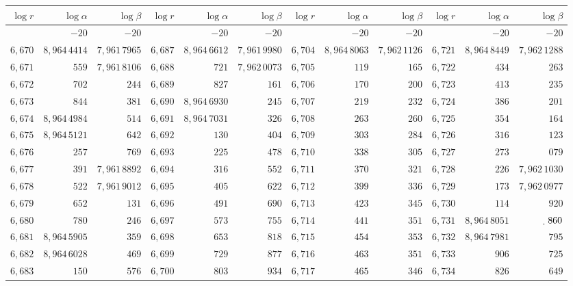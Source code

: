 \begin{center}
\begingroup\fontsize{6.7}{8.4}\selectfont\setlength{\tabcolsep}{1.6pt}\renewcommand{\arraystretch}{1.12}
\begin{tabular}{|r|r|r||r|r|r||r|r|r||r|r|r|}
\hline
$\log r$&$\log\alpha$&$\log\beta$&$\log r$&$\log\alpha$&$\log\beta$&$\log r$&$\log\alpha$&$\log\beta$&$\log r$&$\log\alpha$&$\log\beta$\\\hline\hline
&$-20$&$-20$&&$-20$&$-20$&&$-20$&$-20$&&$-20$&$-20$\\[-3pt]
$6{,}670$&$8{,}964\,4414$&$7{,}961\,7965$&$6{,}687$&$8{,}964\,6612$&$7{,}961\,9980$&$6{,}704$&$8{,}964\,8063$&$7{,}962\,1126$&$6{,}721$&$8{,}964\,8449$&$7{,}962\,1288$\\
$6{,}671$&$559$&$7{,}961\,8106$&$6{,}688$&$721$&$7{,}962\,0073$&$6{,}705$&$119$&$165$&$6{,}722$&$434$&$263$\\
$6{,}672$&$702$&$244$&$6{,}689$&$827$&$161$&$6{,}706$&$170$&$200$&$6{,}723$&$413$&$235$\\
$6{,}673$&$844$&$381$&$6{,}690$&$8{,}964\,6930$&$245$&$6{,}707$&$219$&$232$&$6{,}724$&$386$&$201$\\
$6{,}674$&$8{,}964\,4984$&$514$&$6{,}691$&$8{,}964\,7031$&$326$&$6{,}708$&$263$&$260$&$6{,}725$&$354$&$164$\\
$6{,}675$&$8{,}964\,5121$&$642$&$6{,}692$&$130$&$404$&$6{,}709$&$303$&$284$&$6{,}726$&$316$&$123$\\
$6{,}676$&$257$&$769$&$6{,}693$&$225$&$478$&$6{,}710$&$338$&$305$&$6{,}727$&$273$&$079$\\
$6{,}677$&$391$&$7{,}961\,8892$&$6{,}694$&$316$&$552$&$6{,}711$&$370$&$321$&$6{,}728$&$226$&$7{,}962\,1030$\\
$6{,}678$&$522$&$7{,}961\,9012$&$6{,}695$&$405$&$622$&$6{,}712$&$399$&$336$&$6{,}729$&$173$&$7{,}962\,0977$\\
$6{,}679$&$652$&$131$&$6{,}696$&$491$&$690$&$6{,}713$&$423$&$345$&$6{,}730$&$114$&$920$\\
$6{,}680$&$780$&$246$&$6{,}697$&$573$&$755$&$6{,}714$&$441$&$351$&$6{,}731$&$8{,}964\,8051$&$\raisebox{-.3ex}{.}\;860$\\
$6{,}681$&$8{,}964\,5905$&$359$&$6{,}698$&$653$&$818$&$6{,}715$&$454$&$353$&$6{,}732$&$8{,}964\,7981$&$795$\\
$6{,}682$&$8{,}964\,6028$&$469$&$6{,}699$&$729$&$877$&$6{,}716$&$463$&$351$&$6{,}733$&$906$&$725$\\
$6{,}683$&$150$&$576$&$6{,}700$&$803$&$934$&$6{,}717$&$465$&$346$&$6{,}734$&$826$&$649$\\

\end{tabular}
\end{center}
